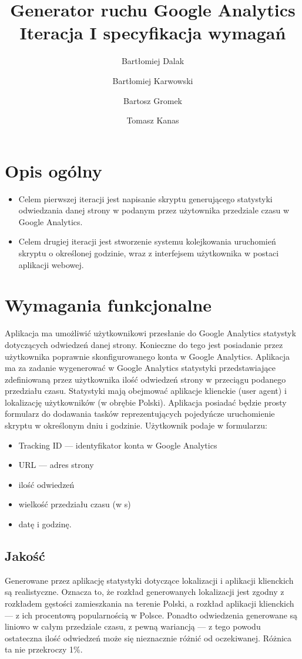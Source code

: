 \documentclass{article}
\title{Generator ruchu Google Analytics \\ Iteracja I specyfikacja wymagań}
\author{Bartłomiej Dalak \and Bartłomiej Karwowski \and Bartosz Gromek \and Tomasz Kanas}
\begin{document}
\maketitle

\section{Opis ogólny}
\begin{itemize}
\item Celem pierwszej iteracji jest napisanie skryptu generującego statystyki odwiedzania danej strony w podanym przez użytownika przedziale czasu w Google Analytics.
\item Celem drugiej iteracji jest stworzenie systemu kolejkowania uruchomień skryptu o określonej godzinie, wraz z interfejsem użytkownika w postaci aplikacji webowej.
\end{itemize}

\section{Wymagania funkcjonalne}

Aplikacja ma umożliwić użytkownikowi przesłanie do Google Analytics statystyk dotyczących odwiedzeń danej strony. Konieczne do tego jest posiadanie przez użytkownika poprawnie skonfigurowanego konta w Google Analytics. Aplikacja ma za zadanie wygenerować w Google Analytics statystyki przedstawiające zdefiniowaną przez użytkownika ilość odwiedzeń strony w przeciągu podanego przedziału czasu. Statystyki mają obejmować aplikacje klienckie (user agent) i lokalizację użytkowników (w obrębie Polski). Aplikacja posiadać będzie prosty formularz do dodawania tasków reprezentujących pojedyńcze uruchomienie skryptu w określonym dniu i godzinie. Użytkownik podaje w formularzu:
\begin{itemize}
\item Tracking ID --- identyfikator konta w Google Analytics
\item URL --- adres strony
\item ilość odwiedzeń
\item wielkość przedziału czasu (w s)
\item datę i godzinę.
\end{itemize}

\subsection{Jakość}
Generowane przez aplikację statystyki dotyczące lokalizacji i aplikacji klienckich są realistyczne. Oznacza to, że rozkład generowanych lokalizacji jest zgodny z rozkładem gęstości zamieszkania na terenie Polski, a rozkład aplikacji klienckich --- z ich procentową popularnością w Polsce. Ponadto odwiedzenia generowane są liniowo w całym przedziale czasu, z pewną wariancją --- z tego powodu ostateczna ilość odwiedzeń może się nieznacznie różnić od oczekiwanej. Różnica ta nie przekroczy 1\%.
\end{document}
